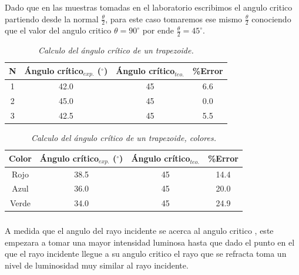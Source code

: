 \documentclass{article}
\begin{document}
\subsubsection{}

Dado que en las muestras tomadas en el laboratorio escribimos el angulo critico partiendo desde la normal  $\frac{\theta}{2}$, para este caso tomaremos ese mismo  $\frac{\theta}{2}$ conociendo que el valor del angulo critico  $\theta=90^{\circ}$ por ende  $\frac{\theta}{2}=45^{\circ}$.

\begin{table}[h!]
\begin{center}
\begin{tabular}{ |c|c|c|c| } 
 \hline
 N & Ángulo crítico$_{exp.}$ ($^{\circ}$) & Ángulo crítico$_{teo.}$ & \%Error\\ 
 \hline
 1 & 42.0  & 45 & 6.6\\ 
 2 & 45.0  & 45 & 0.0\\ 
 3 & 42.5  & 45 & 5.5\\
 \hline
\end{tabular}
\caption{ \emph{Calculo del ángulo crítico de un trapezoide.}}
\label{table:1}
\end{center}
\end{table}

\begin{table}[h!]
\begin{center}
\begin{tabular}{ |c|c|c|c| } 
 \hline
 Color & Ángulo crítico$_{exp.}$ ($^{\circ}$) & Ángulo crítico$_{teo.}$ & \%Error\\ 
 \hline
 Rojo & 38.5  & 45 & 14.4\\ 
 Azul & 36.0  & 45 & 20.0\\ 
 Verde& 34.0  & 45 & 24.9\\
 \hline
\end{tabular}
\caption{ \emph{Calculo del ángulo crítico de un trapezoide, colores.}}
\label{table:1}
\end{center}
\end{table}

\subsubsection{}
A medida que el angulo del rayo incidente se acerca al angulo critico , este empezara a tomar una mayor intensidad luminosa hasta que dado el punto en el que el rayo incidente llegue a su angulo critico el rayo que se refracta toma un nivel de luminosidad muy similar al rayo incidente.
\end{document}
